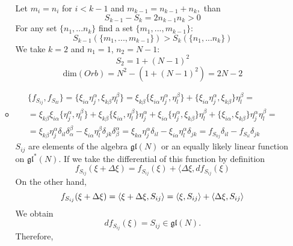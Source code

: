 \documentclass[12pt]{article}
\theoremstyle{definition}
\begin{document}
\begin{enumerate}
\begin{itemize}
    Let $m_i=n_i$ for $i<k-1$ and $m_{k-1}=n_{k-1}+n_{k},$ than
    \begin{equation}
        S_{k-1}-S_{k} = 2n_{k-1}n_{k}>0
    \end{equation}
    For any set $\{n_1,...n_k\}$ find a set $\{m_1,...,m_{k-1}\}$:
    \begin{equation}
        S_{k-1}(\{m_1,...,m_{k-1}\})>S_{k}(\{n_1,...n_k\})
    \end{equation}
    We take $k=2$ and $n_1=1$, $n_2=N-1$:
    \begin{equation}
        S_2=1+(N-1)^2
    \end{equation}
    \begin{equation}
        \boxed{\text{dim}(Orb)=N^2-(1+(N-1)^2)=2N-2}
    \end{equation}
    \item 
    \begin{multline}
        \{f_{S_{ij}}, f_{S_{kl}}\}=\{\xi_{i\alpha}\eta_{j}^{\alpha},\xi_{k\beta}\eta_{l}^{\beta}\}=\xi_{k\beta}\{\xi_{i\alpha}\eta_{j}^{\alpha},\eta_{l}^{\beta}\}+\{\xi_{i\alpha}\eta_{j}^{\alpha},\xi_{k\beta}\}\eta_{l}^{\beta}=\\=\xi_{k\beta}\xi_{i\alpha}\{\eta_{j}^{\alpha},\eta_{l}^{\beta}\}+\xi_{k\beta}\{\xi_{i\alpha},\eta_{l}^{\beta}\}\eta_{j}^{\alpha}+\xi_{i\alpha}\{\eta_{j}^{\alpha},\xi_{k\beta}\}\eta_{l}^{\beta}+\{\xi_{i\alpha},\xi_{k\beta}\}\eta_{j}^{\alpha}\eta_{l}^{\beta}=\\=\xi_{k\beta}\eta_{j}^{\alpha}\delta_{il}\delta_{\alpha}^{\beta}-\xi_{i\alpha}\eta_{l}^{\beta}\delta_{jk}\delta^{\alpha}_{\beta}=\xi_{k\alpha}\eta_{j}^{\alpha}\delta_{il}-\xi_{i\alpha}\eta_{l}^{\alpha}\delta_{jk}=f_{S_{kj}}\delta_{il}-f_{S_{il}}\delta_{jk}
    \end{multline}
    $S_{ij}$ are elements of the algebra $\mathfrak{gl}(N)$ or an equally likely linear function on $\mathfrak{gl}^*(N)$.
    If we take the differential of this function by definition
    \begin{equation}
        f_{S_{ij}}(\xi + \Delta \xi) = f_{S_{ij}}(\xi) + \langle \Delta \xi, df_{S_{ij}}(\xi)
    \end{equation}
    On the other hand,
    \begin{equation}
        f_{S_{ij}}(\xi + \Delta \xi) = \langle \xi + \Delta \xi, S_{ij} \rangle = \langle \xi, S_{ij} \rangle + \braket{\Delta \xi, S_{ij}}
    \end{equation}
    We obtain \[df_{S_{ij}}(\xi) = S_{ij}\in\mathfrak{gl}(N).\]
    Therefore,
    \begin{equation}

\end{equation}
\end{itemize}
\end{enumerate}
\end{document}
